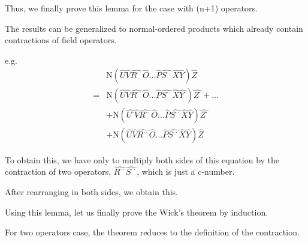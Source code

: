 ﻿\documentclass[twoside]{book}
\numberwithin{equation}{section}
\begin{document}
Thus, we finally prove this lemma for the case with (n+1) operators.

The results can be generalized to normal-ordered products which already contain contractions of field operators.

e.g.
\begin{align}
&\mathrm{N}(\hat{U}\hat{V}\hat{R^{\cdot\cdot}}\hat{O}...\hat{P}\hat{S^{\cdot\cdot}}\hat{X}\hat{Y})\hat{Z} \nonumber \\
=&\mathrm{N}(\hat{U}\hat{V}\hat{R^{\cdot\cdot}}\hat{O}...\hat{P}\hat{S^{\cdot\cdot}}\hat{X}\hat{Y^{\cdot}})\hat{Z^{\cdot}}+... \nonumber \\
&+\mathrm{N}(\hat{U^{\cdot}}\hat{V}\hat{R^{\cdot\cdot}}\hat{O}...\hat{P}\hat{S^{\cdot\cdot}}\hat{X}\hat{Y})\hat{Z^{\cdot}}\nonumber \\
&+\mathrm{N}(\hat{U}\hat{V}\hat{R^{\cdot\cdot}}\hat{O}...\hat{P}\hat{S^{\cdot\cdot}}\hat{X}\hat{Y})\hat{Z}\nonumber
\end{align}

To obtain this, we have only to multiply both sides of this equation by the contraction of two operators, $\hat{R^{\cdot\cdot}}\hat{S^{\cdot\cdot}}$, which is just a c-number.

After rearranging in both sides, we obtain this.


Using this lemma, let us finally prove the Wick's theorem by induction.

For two operators case, the theorem reduces to the definition of the contraction.
\end{document}

